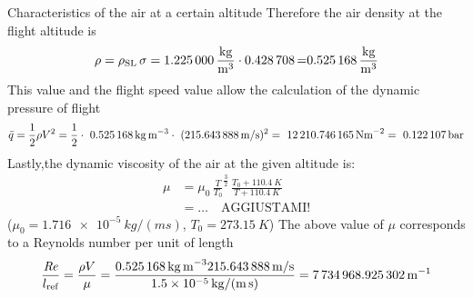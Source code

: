 \documentclass[[12pt,twoside]{book}
\begin{document}
\begin{myExampleX}{Characteristics of the air at a certain altitude}{}
Therefore the air density at the flight altitude is
\[
\rho = \rho_\text{SL} \, \sigma 
    = \SI[round-precision=3]{\myDensitysealevel}{\frac{kg}{m^{3}}} 
        \cdot \SI[round-precision=3]{\myRelativedensity} 
    = \SI[round-precision=3]{\myDensity}{\frac{kg}{m^{3}}}
\]
%
This value and the flight speed value allow the calculation of the dynamic pressure of flight
\[
\bar{q}=\frac{1}{2} \rho V^{2} =\frac{1}{2}\cdot\ \SI[round-precision=3]{\myDensity}{kg~m^{-3}} \cdot\ (\SI[round-precision=2]{\mySpeedMs}{m/s})^{2} =~\SI[round-precision=2]{\myDynamicpressureNm}{N m^{-2}}=~\SI[round-precision=3]{\myDynamicpressureBar}{bar}
\]
Lastly,the dynamic viscosity of the air at the given  altitude is:
\[
\begin{split}
\mu & {}= \mu_0 \, \frac{T}{T_0}^{\frac{3}{2}} \,                 \frac {T_0 + \SI{110.4}{K}}{T + \SI{110.4}{K}}
    \\
    & {}= \ldots \quad\text{AGGIUSTAMI!}
\end{split}
\]
($\mu_0=\SI[scientific-notation=true]{1.716e-5}{kg/(ms)}$, $T_0=\SI{273.15}{K}$)
The above value of $\mu$ corresponds to a Reynolds number per unit of length
\[
 \frac{\text{\itshape{Re}}}{l_\text{ref}} 
   = \frac{\rho V}{\mu}
   = \frac{
     \SI[round-precision=3]{\myDensity}{kg\,m^{-3}}
       \SI[round-precision=2]{\mySpeedMs}{m/s}
       }{
         \SI[round-precision=2,scientific-notation=true]{\myDynamicviscosity}{kg/(m\,s)}
       }
 = \SI[round-precision=0]{\myReynoldsnumeberperunitoflenght}{m^{-1}}
\]

\end{myExampleX}
\end{document}
